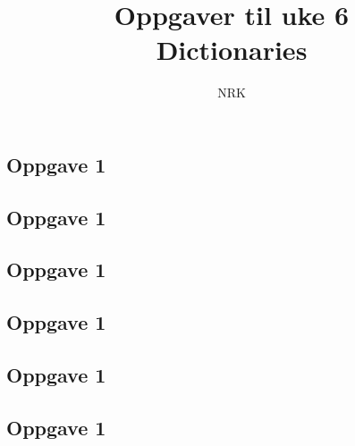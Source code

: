 \documentclass{article}
\title{Oppgaver til uke 6 \\ Dictionaries}
\author{NRK}
\date{}
\begin{document}
\maketitle
\noindent

\subsection*{Oppgave 1}
\subsection*{Oppgave 1}
\subsection*{Oppgave 1}
\subsection*{Oppgave 1}
\subsection*{Oppgave 1}
\subsection*{Oppgave 1}
\end{document}
